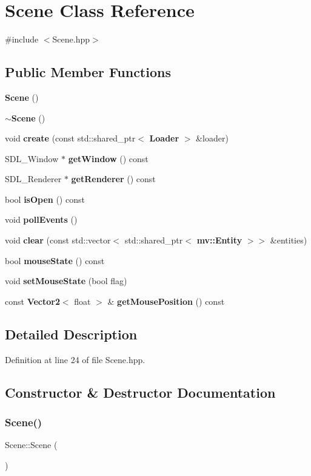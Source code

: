 \section{Scene Class Reference}
\label{class_scene}


{\ttfamily \#include $<$Scene.\+hpp$>$}

\subsection*{Public Member Functions}
\begin{DoxyCompactItemize}
\item 
\textbf{ Scene} ()
\item 
\textbf{ $\sim$\+Scene} ()
\item 
void \textbf{ create} (const std\+::shared\+\_\+ptr$<$ \textbf{ Loader} $>$ \&loader)
\item 
S\+D\+L\+\_\+\+Window $\ast$ \textbf{ get\+Window} () const
\item 
S\+D\+L\+\_\+\+Renderer $\ast$ \textbf{ get\+Renderer} () const
\item 
bool \textbf{ is\+Open} () const
\item 
void \textbf{ poll\+Events} ()
\item 
void \textbf{ clear} (const std\+::vector$<$ std\+::shared\+\_\+ptr$<$ \textbf{ mv\+::\+Entity} $>$$>$ \&entities)
\item 
bool \textbf{ mouse\+State} () const
\item 
void \textbf{ set\+Mouse\+State} (bool flag)
\item 
const \textbf{ Vector2}$<$ float $>$ \& \textbf{ get\+Mouse\+Position} () const
\end{DoxyCompactItemize}


\subsection{Detailed Description}


Definition at line 24 of file Scene.\+hpp.



\subsection{Constructor \& Destructor Documentation}
\mbox{\label{class_scene_ad10176d75a9cc0da56626f682d083507}} 
\subsubsection{Scene()}
{\footnotesize\ttfamily Scene\+::\+Scene (\begin{DoxyParamCaption}{ }\end{DoxyParamCaption})}



